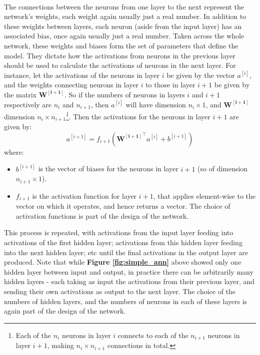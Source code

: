 \documentclass[11pt]{article} %
\theoremstyle{plain}
\theoremstyle{definition}
\begin{document}
\\
\noindent
The connections between the neurons from one layer to the next represent the network's weights, each weight again usually just a real number. In addition to these weights between layers, each neuron (aside from the input layer) has an associated bias, once again usually just a real number. Taken across the whole network, these weights and biases form the set of parameters that define the model. They dictate how the activations from neurons in the previous layer should be used to calculate the activations of neurons in the next layer. For instance, let the activations of the neurons in layer \(i\) be given by the vector \(a^{[i]}\), and the weights connecting neurons in layer \(i\) to those in layer \(i+1\) be given by the matrix \(\mathbf{W^{[i+1]}}\). So if the numbers of neurons in layers \(i\) and \(i+1\) respectively are \(n_i\) and \(n_{i+1}\), then \(a^{[i]}\) will have dimension \(n_i \times 1\), and \(\mathbf{W^{[i+1]}}\) dimension \(n_i \times n_{i+1}\)\footnote{Each of the \(n_i\) neurons in layer \(i\) connects to each of the \(n_{i+1}\) neurons in layer \(i+1\), making \({n_i} \times n_{i+1}\) connections in total.}. Then the activations for the neurons in layer \(i+1\) are given by:
\[a^{[i+1]} = f_{i+1}(\mathbf{{W^{[i+1]}}^{\top}}a^{[i]} + b^{[i+1]}) \]
where:
\begin{itemize}
  \item \(b^{[i+1]}\) is the vector of biases for the neurons in layer \(i+1\) (so of dimension \(n_{i+1} \times 1\)). 
  \item \(f_{i+1}\) is the activation function for layer \(i+1\), that applies element-wise to the vector on which it operates, and hence returns a vector. The choice of activation functions is part of the design of the network.   
\end{itemize}
This process is repeated, with activations from the input layer feeding into activations of the first hidden layer; activations from this hidden layer feeding into the next hidden layer; etc until the final activations in the output layer are produced. Note that while \textbf{Figure \ref{fig:simple_ann}} above showed only one hidden layer between input and output, in practice there can be arbitrarily many hidden layers - each taking as input the activations from their previous layer, and sending their own activations as output to the next layer. The choice of the numbers of hidden layers, and the numbers of neurons in each of these layers is again part of the design of the network.   
\end{document}
